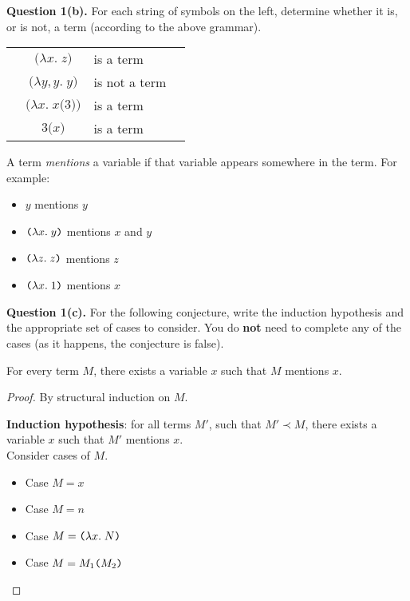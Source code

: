 \textbf{Question 1(b).} For each string of symbols on the left, determine whether it is, or is not, a term (according to the above grammar).

\medskip

\begin{tabular}{rcll}
&  $\texttt(\lambda x.\;z\texttt)$ &  is a term
\\[1ex]
&  $\texttt(\lambda y, y.\;y\texttt)$ & is not a term
\\[1ex]
&  $\texttt(\lambda x.\;x\texttt(3\texttt)\texttt)$ &  is a term
\\[1ex]
&  $3\texttt(x\texttt)$ & is a term
\end{tabular}

\clearpage

A term \emph{mentions} a variable if that variable appears somewhere in the term.
For example:

\begin{itemize}
\item  $y$ mentions $y$
\item  $\texttt(\lambda{x}.\;{y}\texttt)$ mentions $x$ and $y$
\item  $\texttt(\lambda{z}.\;{z}\texttt)$ mentions $z$
\item  $\texttt(\lambda{x}.\;{1}\texttt)$ mentions $x$
\end{itemize}


\textbf{Question 1(c).}
For the following conjecture, write the induction hypothesis and the appropriate set
of cases to consider.  You do \textbf{not} need to complete any of the cases (as it happens, the conjecture is false).

\begin{conjecture*}
  For every term $M$, there exists a variable $x$ such that $M$ mentions $x$.
\end{conjecture*}
\begin{proof}
  By structural induction on $M$.

  \medskip

  \textbf{Induction hypothesis}: for all terms $M'$, such that $M'\prec M$, there exists a variable $x$ such that $M'$ mentions $x$.\\

  Consider cases of $M$.

  \begin{itemize}
  \item Case $M=x$
  \item Case $M=n$
  \item Case $M=\texttt(\lambda{x}.\;{N}\texttt)$
  \item Case $M={M_1}\texttt(M_2\texttt)$
  \vspace*{33ex}
  \end{itemize}
\end{proof}


